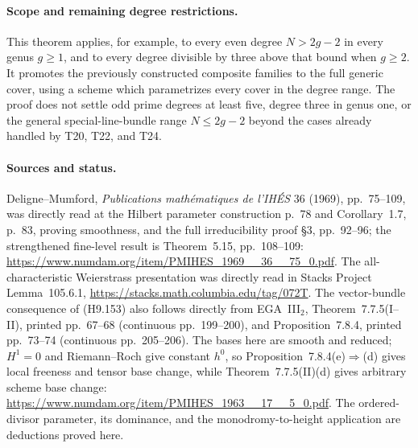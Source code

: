 \paragraph{Scope and remaining degree restrictions.}
This theorem applies, for example, to every even
degree $N>2g-2$ in every genus $g\ge1$, and to every
degree divisible by three above that bound when
$g\ge2$. It promotes the previously constructed
composite families to the full generic cover,
using a scheme which parametrizes every cover in
the degree range. The proof does not settle odd
prime degrees at least five, degree three in
genus one, or the general special-line-bundle
range $N\le2g-2$ beyond the cases already handled
by T20, T22, and T24.

\paragraph{Sources and status.}
Deligne--Mumford, \emph{Publications math\'ematiques
de l'IH\'ES} 36 (1969), pp.~75--109, was directly
read at the Hilbert parameter construction p.~78
and Corollary~1.7, p.~83, proving smoothness,
and the full irreducibility proof \S3,
pp.~92--96; the strengthened fine-level result
is Theorem~5.15, pp.~108--109:
\url{https://www.numdam.org/item/PMIHES_1969__36__75_0.pdf}.
The all-characteristic Weierstrass presentation
was directly read in Stacks Project
Lemma~105.6.1,
\url{https://stacks.math.columbia.edu/tag/072T}.
The vector-bundle consequence of (H9.153) also follows
directly from EGA~III$_2$, Theorem~7.7.5(I--II),
printed pp.~67--68 (continuous pp.~199--200), and
Proposition~7.8.4, printed pp.~73--74 (continuous
pp.~205--206). The bases here are smooth and reduced;
$H^1=0$ and Riemann--Roch give constant $h^0$, so
Proposition~7.8.4(e)$\Rightarrow$(d) gives local
freeness and tensor base change, while
Theorem~7.7.5(II)(d) gives arbitrary scheme base change:
\url{https://www.numdam.org/item/PMIHES_1963__17__5_0.pdf}.
The ordered-divisor parameter,
its dominance, and the monodromy-to-height
application are deductions proved here.
